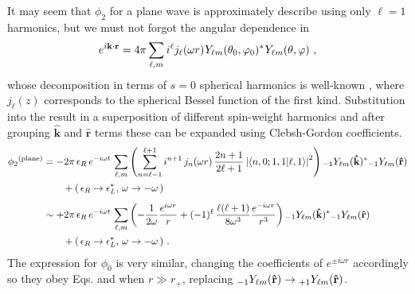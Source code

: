 It may seem that $\phi_2$ for a plane wave is approximately describe using only $\ell=1$ harmonics, but we must not forgot the angular dependence in
\begin{align}
    e^{i \mathbf{k} \cdot \mathbf{r}} = 4 \pi \sum_{\ell,m} i^\ell j_\ell(\omega r) \uu{Y}{\ell m}(\theta_0,\varphi_0)^{*} \uu{Y}{\ell m}(\theta,\varphi) ~,
\end{align}
whose decomposition in terms of $s=0$ spherical harmonics is well-known \cite{Jackson1998}, where $j_\ell(z)$ corresponds to the spherical Bessel function of the first kind.
Substitution into the result in a superposition of different spin-weight harmonics and after grouping $\mathbf{\hat{k}}$ and $\mathbf{\hat{r}}$ terms these can be expanded using Clebsh-Gordon coefficients.
\begin{align}
    \label{eq5:phi2planeExpanded}
    \begin{split}
        \phi_2{}^{(\mathrm{plane})} &= - 2 \pi \,\epsilon_R \,e^{-i \omega t} \,\sum_{\ell,m} \left(
        \sum_{n=\ell-1}^{\ell+1} i^{n + 1} \,j_n(\omega r) \,\frac{2n + 1}{2\ell + 1} 
        \left|\langle n,0 ; 1,1 | \ell,1 \rangle\right|^2 \right)
        \uu[-1]{Y}{\ell m}(\mathbf{\hat{k}})^{*} \uu[-1]{Y}{\ell m}(\mathbf{\hat{r}}) \\
        & \qquad + ( \,\epsilon_R \to \epsilon_L^*, \,\omega \to -\omega \,) \\[0.15cm]
        &\sim + 2 \pi \,\epsilon_R \,e^{-i \omega t} \,\sum_{\ell,m} \left(
        -\frac{1}{2 \omega} \frac{e^{i \omega r}}{r} 
        + (-1)^\ell \,\frac{\ell(\ell+1)}{8 \omega^3} \frac{e^{-i \omega r}}{r^3} \right)
        \uu[-1]{Y}{\ell m}(\mathbf{\hat{k}})^{*} \uu[-1]{Y}{\ell m}(\mathbf{\hat{r}}) \\
        & \qquad + (\,\epsilon_R \to \epsilon_L^*, \,\omega \to -\omega \,) ~.
    \end{split}
\end{align}
The expression for $\phi_0$ is very similar, changing the coefficients of $e^{\pm i \omega r}$ accordingly so they obey Eqs.  and  when $r \gg r_{+}$, replacing $\uu[-1]{Y}{\ell m}(\mathbf{\hat{r}})\to\uu[+1]{Y}{\ell m}(\mathbf{\hat{r}})$.


